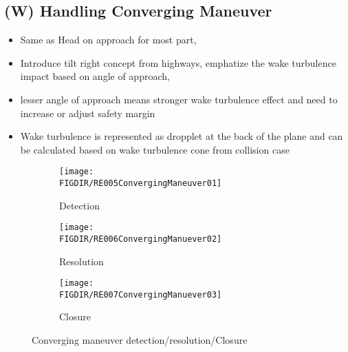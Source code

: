 \subsection{(W) Handling Converging Maneuver}\label{sec:handlingConvergingManuever}
    \begin{itemize}
        \item Same as Head on approach for most part,
        \item Introduce tilt right concept from highways, emphatize the wake turbulence impact based on angle of approach, 
        \item lesser angle of approach means stronger wake turbulence effect and need to increase or adjust safety margin 
        \item Wake turbulence is represented as dropplet at the back of the plane and can be calculated based on wake turbulence cone from collision case
    \end{itemize}
    \begin{figure}[H]
    	\centering
        \begin{subfigure}{0.32\textwidth}
        	\centering
            \texttt{[image: \\FIGDIR/RE005ConvergingManeuver01]} 
            \caption{Detection}
            \label{fig:ConvergingManeuverTheoreticalDetection}
        \end{subfigure}
        \begin{subfigure}{0.32\textwidth}
	        \centering
            \texttt{[image: \\FIGDIR/RE006ConvergingManuever02]} 
            \caption{Resolution}
            \label{fig:ConvergingManeuverTheoreticalResolution}
        \end{subfigure}
        \begin{subfigure}{0.32\textwidth}
	        \centering
            \texttt{[image: \\FIGDIR/RE007ConvergingManuever03]} 
            \caption{Closure}
            \label{fig:ConvergingManeuverTheoreticalClosure}
        \end{subfigure}
        \caption{Converging maneuver detection/resolution/Closure}
        \label{fig:ConvergingManeuverTheoretical}
    \end{figure}

